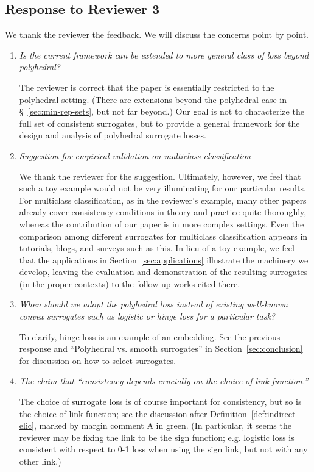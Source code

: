 \documentclass[a4paper]{article}
\begin{document}
\subsection*{Response to Reviewer 3}

We thank the reviewer the feedback. We will discuss the concerns point by point.

\begin{enumerate}
	\item \emph{Is the current framework can be extended to more general class of loss beyond polyhedral?}
	
	The reviewer is correct that the paper is essentially restricted to the polyhedral setting.  (There are extensions beyond the polyhedral case in \S~\ref{sec:min-rep-sets}, but not far beyond.)  Our goal is not to characterize the full set of consistent surrogates, but to provide a general framework for the design and analysis of polyhedral surrogate losses.
	
	\item \emph{Suggestion for empirical validation on multiclass classification}
	
	We thank the reviewer for the suggestion.  Ultimately, however, we feel that such a toy example would not be very illuminating for our particular results.  For multiclass classification, as in the reviewer’s example, many other papers already cover consistency conditions in theory and practice quite thoroughly, whereas the contribution of our paper is in more complex settings.  Even the comparison among different surrogates for multiclass classification appears in tutorials, blogs, and surveys such as \href{https://faculty.ist.psu.edu/vhonavar/Courses/ds310/lossfunc.pdf}{this}. 
	In lieu of a toy example, we feel that the applications in Section~\ref{sec:applications} illustrate the machinery we develop, leaving the evaluation and demonstration of the resulting surrogates (in the proper contexts) to the follow-up works cited there.
	
	\item \emph{When should we adopt the polyhedral loss instead of existing well-known convex surrogates such as logistic or hinge loss for a particular task?}
	
	To clarify, hinge loss is an example of an embedding.  See the previous response and “Polyhedral vs. smooth surrogates” in Section~\ref{sec:conclusion} for discussion on how to select surrogates.
	
	\item \emph{The claim that ``consistency depends crucially on the choice of link function.''}

	The choice of surrogate loss is of course important for consistency, but so is the choice of link function; see the discussion after Definition~\ref{def:indirect-elic}, marked by margin comment A in green.  
	(In particular, it seems the reviewer may be fixing the link to be the sign function; e.g. logistic loss is consistent with respect to 0-1 loss when using the sign link, but not with any other link.)	
	
\end{enumerate}
\end{document}
